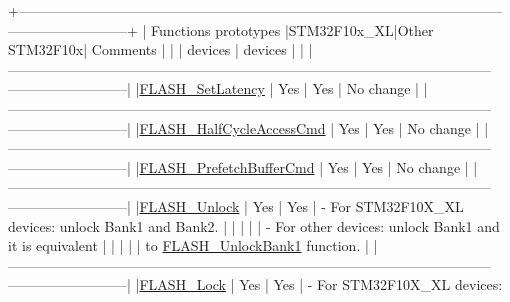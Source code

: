 \begin{DoxyCode}
  +--------------------------------------------------------------------------------------------------------
      --------------------------+
  |       Functions prototypes         |STM32F10x\_XL|Other STM32F10x|    Comments                          
                                |
  |                                    |   devices  |  devices      |                                      
                                |
  |--------------------------------------------------------------------------------------------------------
      --------------------------|
  |\hyperlink{group___f_l_a_s_h___exported___functions_ga54bcb96270215c752c3479c8c9e438c0}{FLASH\_SetLatency}                    |    Yes     |      Yes      | No change            
                                                |
  |--------------------------------------------------------------------------------------------------------
      --------------------------|
  |\hyperlink{group___f_l_a_s_h___exported___functions_ga978103a57b37920ac01128e999f9ece6}{FLASH\_HalfCycleAccessCmd}            |    Yes     |      Yes      | No change    
                                                        |
  |--------------------------------------------------------------------------------------------------------
      --------------------------|
  |\hyperlink{group___f_l_a_s_h___exported___functions_ga6b93faaf0f560bf8d662b2cefe2f70e8}{FLASH\_PrefetchBufferCmd}             |    Yes     |      Yes      | No change     
                                                       |
  |--------------------------------------------------------------------------------------------------------
      --------------------------|
  |\hyperlink{group___f_l_a_s_h___exported___functions_ga4084d0184bab463a1579271bf474aaef}{FLASH\_Unlock}                        |    Yes     |      Yes      | - For STM32F10X\_XL 
      devices: unlock Bank1 and Bank2.            |
  |                                    |            |               | - For other devices: unlock Bank1 and
       it is equivalent         |
  |                                    |            |               |   to 
      \hyperlink{group___f_l_a_s_h___exported___functions_ga358c4b7e0ef20693ca62cc9d20c94a5a}{FLASH\_UnlockBank1} \textcolor{keyword}{function}.                               |
  |--------------------------------------------------------------------------------------------------------
      --------------------------|
  |\hyperlink{group___f_l_a_s_h___exported___functions_ga46899557353c4312ddbe3f25e65df1d8}{FLASH\_Lock}                          |    Yes     |      Yes      | - For STM32F10X\_XL devices:

\end{DoxyCode}
